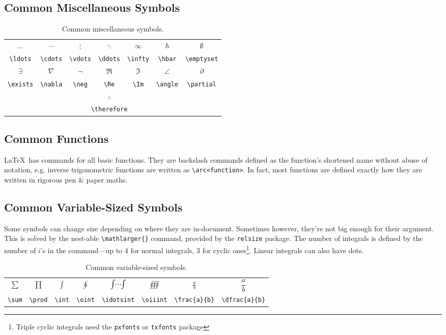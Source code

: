 \subsection{Common Miscellaneous Symbols}
%
\begin{table}[!htbp]
    \centering
    \caption{Common miscellaneous symbols.}
    \label{t:miscfym}
    \begin{tabular}{ccccccc}
        $\ldots$ & $\cdots$ & $\vdots$ & $\ddots$ & $\infty$ & $\hbar$ & $\emptyset$\\
        \verb|\ldots| & \verb|\cdots| & \verb|\vdots| & \verb|\ddots| & \verb|\infty| & \verb|\hbar| & \verb|\emptyset|\\
        $\exists$ & $\nabla$ & $\neg$ & $\Re$ & $\Im$ & $\angle$ & $\partial$\\
        \verb|\exists| & \verb|\nabla| & \verb|\neg| & \verb|\Re| & \verb|\Im| & \verb|\angle| & \verb|\partial|\\
        & \multicolumn{5}{c}{$\therefore$} & \\
        & \multicolumn{5}{c}{\texttt{\textbackslash therefore}} & \\
    \end{tabular}
\end{table}
%
\subsection{Common Functions}
%
\LaTeX~has commands for all basic functions. They are backslash commands defined as the function's shortened name without abuse of notation, e.g. inverse trigonometric functions are written as \verb|\arc<function>|. In fact, most functions are defined exactly how they are written in rigorous pen \& paper maths.
%
\subsection{Common Variable-Sized Symbols}
%
Some symbols can change size depending on where they are in-document. Sometimes however, they're not big enough for their argument. This is solved by the nest-able \verb|\mathlarger{}| command, provided by the \verb|relsize| package. The number of integrals is defined by the number of $i$'s in the command---up to 4 for normal integrals, 3 for cyclic ones\footnote{Triple cyclic integrals need the \texttt{pxfonts} or \texttt{txfonts} package}. Linear integrals can also have dots. 
\begin{table}[!htbp]
    \centering
    \caption{Common variable-sized symbols.}
    \label{t:vss}
    \begin{tabular}{cccccccc}
        $\sum$ & $\prod$ & $\int$ & $\oint$ & $\idotsint$ & $\oiiint$ & $\frac{a}{b}$ & $\dfrac{a}{b}$ \\
        \verb|\sum| & \verb|\prod| & \verb|\int| & \verb|\oint| & \verb|\idotsint| & \verb|\oiiint| & \verb|\frac{a}{b}| & \verb|\dfrac{a}{b}| \\
    \end{tabular}
\end{table}
%
